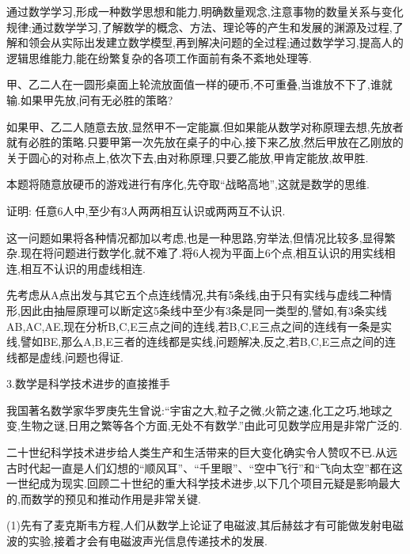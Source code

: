 通过数学学习,形成一种数学思想和能力,明确数量观念,注意事物的数量关系与变化规律;通过数学学习,了解数学的概念、方法、理论等的产生和发展的渊源及过程,了解和领会从实际出发建立数学模型,再到解决问题的全过程;通过数学学习,提高人的逻辑思维能力,能在纷繁复杂的各项工作面前有条不紊地处理等.

\begin{example}
	甲、乙二人在一圆形桌面上轮流放面值一样的硬币,不可重叠,当谁放不下了,谁就输.如果甲先放,问有无必胜的策略?
\end{example}

\begin{analysis}
	如果甲、乙二人随意去放,显然甲不一定能赢.但如果能从数学对称原理去想,先放者就有必胜的策略.只要甲第一次先放在桌子的中心,接下来乙放,然后甲放在乙刚放的关于圆心的对称点上,依次下去,由对称原理,只要乙能放,甲肯定能放,故甲胜.

	本题将随意放硬币的游戏进行有序化,先夺取“战略高地”,这就是数学的思维.
\end{analysis}

\begin{example}
	证明: 任意6人中,至少有3人两两相互认识或两两互不认识.
\end{example}

\begin{analysis}
	这一问题如果将各种情况都加以考虑,也是一种思路,穷举法,但情况比较多,显得繁杂.现在将问题进行数学化,就不难了.将6人视为平面上6个点,相互认识的用实线相连,相互不认识的用虚线相连.

	先考虑从A点出发与其它五个点连线情况,共有5条线,由于只有实线与虚线二种情形,因此由抽屉原理可以断定这5条线中至少有3条是同一类型的,譬如,有3条实线AB,AC,AE,现在分析B,C,E三点之间的连线,若B,C,E三点之间的连线有一条是实线,譬如BE,那么A,B,E三者的连线都是实线,问题解决,反之,若B,C,E三点之间的连线都是虚线,问题也得证.
\end{analysis}

3.数学是科学技术进步的直接推手

我国著名数学家华罗庚先生曾说:“宇宙之大,粒子之微,火箭之速,化工之巧,地球之变,生物之谜,日用之繁等各个方面,无处不有数学.”由此可见数学应用是非常广泛的.

二十世纪科学技术进步给人类生产和生活带来的巨大变化确实令人赞叹不已.从远古时代起一直是人们幻想的“顺风耳”、“千里眼”、“空中飞行”和“飞向太空”都在这一世纪成为现实.回顾二十世纪的重大科学技术进步,以下几个项目元疑是影响最大的,而数学的预见和推动作用是非常关键.

(1)先有了麦克斯韦方程,人们从数学上论证了电磁波,其后赫兹才有可能做发射电磁波的实验,接着才会有电磁波声光信息传递技术的发展.

